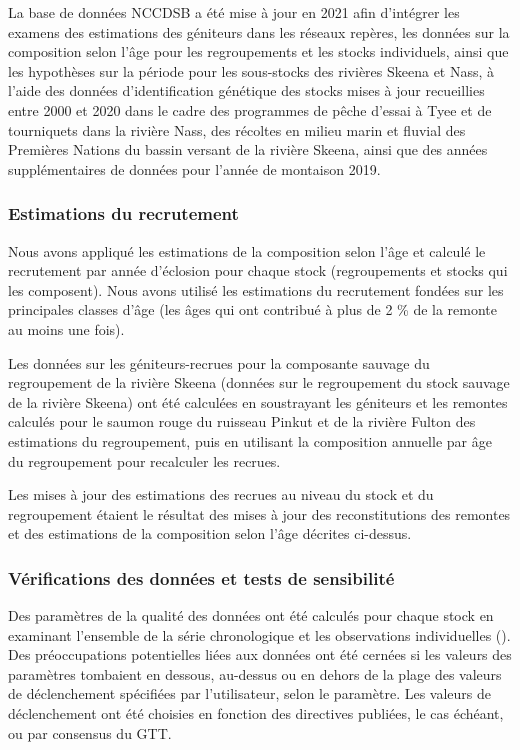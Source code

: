 \documentclass[french,11pt]{book}
\begin{document}
La base de données NCCDSB a été mise à jour en 2021 afin d'intégrer les examens des estimations des géniteurs dans les réseaux repères, les données sur la composition selon l'âge pour les regroupements et les stocks individuels, ainsi que les hypothèses sur la période pour les sous-stocks des rivières Skeena et Nass, à l'aide des données d'identification génétique des stocks mises à jour recueillies entre 2000 et 2020 dans le cadre des programmes de pêche d'essai à Tyee et de tourniquets dans la rivière Nass, des récoltes en milieu marin et fluvial des Premières Nations du bassin versant de la rivière Skeena, ainsi que des années supplémentaires de données pour l'année de montaison 2019.

\subsubsection{Estimations du recrutement}\label{estimations-du-recrutement}

Nous avons appliqué les estimations de la composition selon l'âge et calculé le recrutement par année d'éclosion pour chaque stock (regroupements et stocks qui les composent). Nous avons utilisé les estimations du recrutement fondées sur les principales classes d'âge (les âges qui ont contribué à plus de 2 \% de la remonte au moins une fois).

Les données sur les géniteurs-recrues pour la composante sauvage du regroupement de la rivière Skeena (données sur le regroupement du stock sauvage de la rivière Skeena) ont été calculées en soustrayant les géniteurs et les remontes calculés pour le saumon rouge du ruisseau Pinkut et de la rivière Fulton des estimations du regroupement, puis en utilisant la composition annuelle par âge du regroupement pour recalculer les recrues.

Les mises à jour des estimations des recrues au niveau du stock et du regroupement étaient le résultat des mises à jour des reconstitutions des remontes et des estimations de la composition selon l'âge décrites ci-dessus.

\subsubsection{Vérifications des données et tests de sensibilité}\label{vuxe9rifications-des-donnuxe9es-et-tests-de-sensibilituxe9}

Des paramètres de la qualité des données ont été calculés pour chaque stock en examinant l'ensemble de la série chronologique et les observations individuelles (). Des préoccupations potentielles liées aux données ont été cernées si les valeurs des paramètres tombaient en dessous, au-dessus ou en dehors de la plage des valeurs de déclenchement spécifiées par l'utilisateur, selon le paramètre. Les valeurs de déclenchement ont été choisies en fonction des directives publiées, le cas échéant, ou par consensus du GTT.
\end{document}
